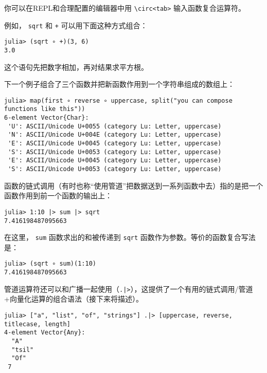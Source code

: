 你可以在REPL和合理配置的编辑器中用 \texttt{{\textbackslash}circ<tab>} 输入函数复合运算符。



例如， \texttt{sqrt} 和 \texttt{+} 可以用下面这种方式组合：




\begin{verbatim}
julia> (sqrt ∘ +)(3, 6)
3.0
\end{verbatim}



这个语句先把数字相加，再对结果求平方根。



下一个例子组合了三个函数并把新函数作用到一个字符串组成的数组上：




\begin{verbatim}
julia> map(first ∘ reverse ∘ uppercase, split("you can compose functions like this"))
6-element Vector{Char}:
 'U': ASCII/Unicode U+0055 (category Lu: Letter, uppercase)
 'N': ASCII/Unicode U+004E (category Lu: Letter, uppercase)
 'E': ASCII/Unicode U+0045 (category Lu: Letter, uppercase)
 'S': ASCII/Unicode U+0053 (category Lu: Letter, uppercase)
 'E': ASCII/Unicode U+0045 (category Lu: Letter, uppercase)
 'S': ASCII/Unicode U+0053 (category Lu: Letter, uppercase)
\end{verbatim}



函数的链式调用（有时也称“使用管道”把数据送到一系列函数中去）指的是把一个函数作用到前一个函数的输出上：




\begin{verbatim}
julia> 1:10 |> sum |> sqrt
7.416198487095663
\end{verbatim}



在这里， \texttt{sum} 函数求出的和被传递到 \texttt{sqrt} 函数作为参数。等价的函数复合写法是：




\begin{verbatim}
julia> (sqrt ∘ sum)(1:10)
7.416198487095663
\end{verbatim}



管道运算符还可以和广播一起使用（\texttt{.|>}），这提供了一个有用的链式调用/管道+向量化运算的组合语法（接下来将描述）。




\begin{verbatim}
julia> ["a", "list", "of", "strings"] .|> [uppercase, reverse, titlecase, length]
4-element Vector{Any}:
  "A"
  "tsil"
  "Of"
 7
\end{verbatim}



